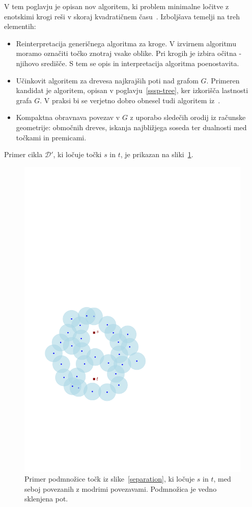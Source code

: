 \documentclass[a4paper, 12pt]{book}
\newcommand{\D}{\ensuremath{\mathcal{D}}}
\begin{document}
V tem poglavju je opisan nov algoritem, ki problem minimalne ločitve z enotskimi krogi reši v skoraj kvadratičnem času~\cite{CM2}. Izboljšava temelji na treh elementih:
\begin{itemize}
\item Reinterpretacija generičnega algoritma za kroge. V izvirnem algoritmu moramo označiti točko znotraj vsake oblike. Pri krogih je izbira očitna - njihovo središče. S tem se opis in interpretacija algoritma poenostavita.
\item Učinkovit algoritem za drevesa najkrajših poti nad grafom $G$. Primeren kandidat je algoritem, opisan v poglavju~\ref{sssp-tree}, ker izkorišča lastnosti grafa $G$. V praksi bi se verjetno dobro obnesel tudi algoritem iz~\cite{ChanS16}.
\item Kompaktna obravnava povezav v $G$ z uporabo sledečih orodij iz računske geometrije: območnih dreves, iskanja najbližjega soseda ter dualnosti med točkami in premicami. 
\end{itemize}

Primer cikla $\D'$, ki ločuje točki $s$ in $t$, je prikazan na sliki~\ref{walk}.

\begin{figure}[htp]
\centerline{\includegraphics[scale=0.6,page=3]{pics/separation.pdf}}
\caption{Primer podmnožice točk iz slike~\ref{separation}, ki ločuje $s$ in $t$, med seboj povezanih z modrimi povezavami. Podmnožica je vedno sklenjena pot.}
\label{walk}
\end{figure}
\end{document}
